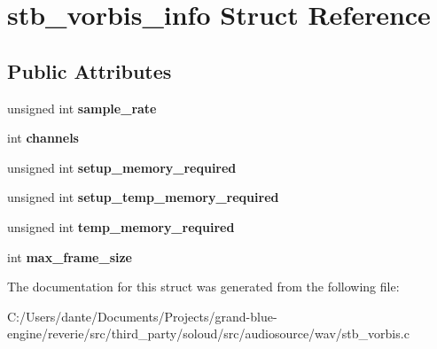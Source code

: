 \hypertarget{structstb__vorbis__info}{}\section{stb\+\_\+vorbis\+\_\+info Struct Reference}
\label{structstb__vorbis__info}
\subsection*{Public Attributes}
\begin{DoxyCompactItemize}
\item 
\mbox{\label{structstb__vorbis__info_a9ccd1991052734f88a4bd3743b749993}} 
unsigned int {\bfseries sample\+\_\+rate}
\item 
\mbox{\label{structstb__vorbis__info_a074f6af8c99f6c583696d34bf4c7744a}} 
int {\bfseries channels}
\item 
\mbox{\label{structstb__vorbis__info_a3dd3e567beb2bb9d7d62dcca83f301fb}} 
unsigned int {\bfseries setup\+\_\+memory\+\_\+required}
\item 
\mbox{\label{structstb__vorbis__info_aec05c013773be9d8d52f9bb784bdc084}} 
unsigned int {\bfseries setup\+\_\+temp\+\_\+memory\+\_\+required}
\item 
\mbox{\label{structstb__vorbis__info_a2fe235656197249fc3a6b5e27ff2da82}} 
unsigned int {\bfseries temp\+\_\+memory\+\_\+required}
\item 
\mbox{\label{structstb__vorbis__info_ad07f41541db438dcdac6ca223c5876e9}} 
int {\bfseries max\+\_\+frame\+\_\+size}
\end{DoxyCompactItemize}


The documentation for this struct was generated from the following file\+:\begin{DoxyCompactItemize}
\item 
C\+:/\+Users/dante/\+Documents/\+Projects/grand-\/blue-\/engine/reverie/src/third\+\_\+party/soloud/src/audiosource/wav/stb\+\_\+vorbis.\+c\end{DoxyCompactItemize}
